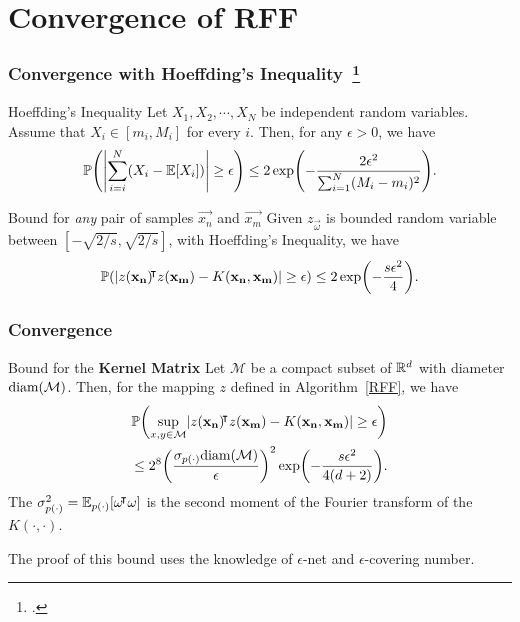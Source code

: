 \documentclass[10pt]{../formats/RU}
\begin{document}
\section{Convergence of RFF}
\begin{frame}
  \frametitle{Convergence with Hoeffding's Inequality~\footcite{vershynin_hdp}}
  \begin{block}{Hoeffding's Inequality}
    Let $X_1, X_2,\cdots, X_N$ be independent random variables. Assume that $X_i \in [m_i, M_i]$ for every $i$. Then, for any $\epsilon > 0$, we have
    \[
    \P{\abs*{\sum_{i=i}^{N}(X_i-\E{X_i})}\geq \epsilon} \leq 2\exp\parens*{-\frac{2\epsilon^2}{\sum_{i=1}^{N}(M_i-m_i)^2}}.
    \]
  \end{block}
  \begin{exampleblock}{Bound for \emph{any} pair of samples $\vec{x_n}$ and $\vec{x_m}$}
    Given $z_{\vec{\omega}}$ is bounded random variable between $[-\sqrt{2/s}, \sqrt{2/s}]$, with Hoeffding's Inequality, we have
    \begin{align*}
      \P{\abs{z(\vec{x_n})\trn z(\vec{x_m})-K(\vec{x_n}, \vec{x_m})}\geq \epsilon} \leq 2\exp\parens*{-\frac{s\epsilon^2}{4}}.
    \end{align*}
  \end{exampleblock}
\end{frame}
\begin{frame}
  \frametitle{Convergence}
  \begin{exampleblock}{Bound for the \textbf{Kernel Matrix}}
    Let $\mathcal{M}$ be a compact subset of $\mathbb{R}^d$ with diameter $\textnormal{diam}(\mathcal{M})$. Then, for the mapping $z$ defined in Algorithm~\ref{RFF}, we have
    \begin{align*}
      \P{\sup_{x,y\in\mathcal{M}}\abs{z(\vec{x_n})\trn z(\vec{x_m})-K(\vec{x_n}, \vec{x_m})}\geq \epsilon} \\
      \leq 2^8\parens*{\frac{\sigma_{p(\cdot)}\textnormal{diam}(\mathcal{M})}{\epsilon}}^2\exp\parens*{-\frac{s\epsilon^2}{4(d+2)}}.
    \end{align*}
    The $\sigma_{p(\cdot)}^2=\mathbb{E}_{p(\cdot)}\bracks*{\vec{\omega}\trn\vec{\omega}}$ is the second moment of the Fourier transform of the $K(\cdot,\cdot)$.
  \end{exampleblock}
  The proof of this bound uses the knowledge of $\epsilon$-net and $\epsilon$-covering number.
\end{frame}

\end{document}
